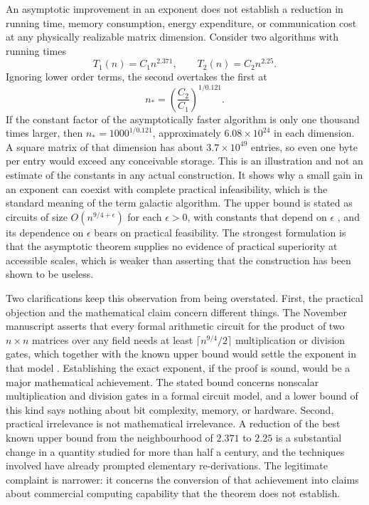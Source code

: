 \documentclass[12pt]{article}
\begin{document}
An asymptotic improvement in an exponent does not establish a reduction in running time, memory consumption, energy expenditure, or communication cost at any physically realizable matrix dimension. Consider two algorithms with running times
\begin{equation}
T_1(n) = C_1 n^{2.371}, \qquad T_2(n) = C_2 n^{2.25}.
\end{equation}
Ignoring lower order terms, the second overtakes the first at
\begin{equation}
n_\ast = \left(\frac{C_2}{C_1}\right)^{1/0.121}.
\end{equation}
If the constant factor of the asymptotically faster algorithm is only one thousand times larger, then $n_\ast = 1000^{1/0.121}$, approximately $6.08\times 10^{24}$ in each dimension. A square matrix of that dimension has about $3.7\times 10^{49}$ entries, so even one byte per entry would exceed any conceivable storage. This is an illustration and not an estimate of the constants in any actual construction. It shows why a small gain in an exponent can coexist with complete practical infeasibility, which is the standard meaning of the term galactic algorithm. The upper bound is stated as circuits of size $O(n^{9/4+\epsilon})$ for each $\epsilon>0$, with constants that depend on $\epsilon$ \cite{openai-nine-fourths}, and its dependence on $\epsilon$ bears on practical feasibility. The strongest formulation is that the asymptotic theorem supplies no evidence of practical superiority at accessible scales, which is weaker than asserting that the construction has been shown to be useless.

Two clarifications keep this observation from being overstated. First, the practical objection and the mathematical claim concern different things. The November manuscript asserts that every formal arithmetic circuit for the product of two $n\times n$ matrices over any field needs at least $\lceil n^{9/4}/2\rceil$ multiplication or division gates, which together with the known upper bound would settle the exponent in that model \cite{openai-nine-fourths}. Establishing the exact exponent, if the proof is sound, would be a major mathematical achievement. The stated bound concerns nonscalar multiplication and division gates in a formal circuit model, and a lower bound of this kind says nothing about bit complexity, memory, or hardware. Second, practical irrelevance is not mathematical irrelevance. A reduction of the best known upper bound from the neighbourhood of $2.371$ \cite{dupont-alphaevolve} to $2.25$ is a substantial change in a quantity studied for more than half a century, and the techniques involved have already prompted elementary re-derivations. The legitimate complaint is narrower: it concerns the conversion of that achievement into claims about commercial computing capability that the theorem does not establish.
\end{document}
